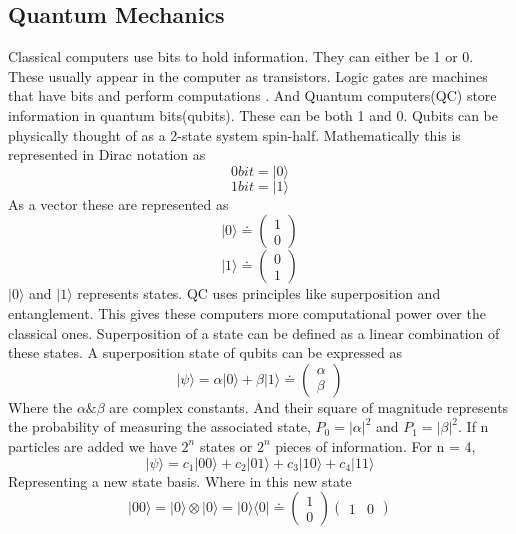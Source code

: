 \documentclass[15pt, a4paper]{Assignment}
\begin{document}
\subsection*{Quantum Mechanics}
Classical computers use bits to hold information.
They can either be 1 or 0.
These usually appear in the computer as transistors.
Logic gates are machines that have bits and perform computations \cite{deutsch1985quantum}.
And Quantum computers(QC) store information in quantum bits(qubits).
These can be both 1 and 0.
Qubits can be physically thought of as a 2-state system spin-half.
Mathematically this is represented in Dirac notation as $$0 bit =|0\rangle $$ $$1 bit =  |1\rangle$$
As a vector these are represented as 
$$|0\rangle \doteq \begin{pmatrix}
	1\\0
\end{pmatrix}$$
$$|1\rangle \doteq \begin{pmatrix}
	0\\1
\end{pmatrix}$$
$|0\rangle$ and $|1\rangle$ represents states.
QC uses principles like superposition and entanglement.
This gives these computers more computational power over the classical ones.
Superposition of a state can be defined as a linear combination of these states.\cite{mcintyre_quantum_2012}
A superposition state of qubits can be expressed as \begin{equation}
|\psi\rangle = \alpha|0\rangle + \beta|1\rangle \doteq \begin{pmatrix}
	\alpha\\\beta
\end{pmatrix} \end{equation}
Where the $\alpha \& \beta$ are complex constants.
And their square of magnitude represents the probability of measuring the associated state, $P_{0}=|\alpha|^2$ and $P_{1}=|\beta|^2$. 
If n particles are added we have $2^n$ states or $2^n$ pieces of information. 
For n = 4,
\begin{equation}
	|\psi\rangle =c_1 |00\rangle+c_2 |01\rangle+c_3 |10\rangle+ c_4 |11\rangle
\end{equation}
Representing a new state basis. 
Where in this new state \begin{equation}|00\rangle = |0\rangle\otimes|0\rangle =|0\rangle\langle 0| \doteq
	\begin{pmatrix}
		1\\0
	\end{pmatrix} \begin{pmatrix}
		1&0
\end{pmatrix}\end{equation}
\end{document}
